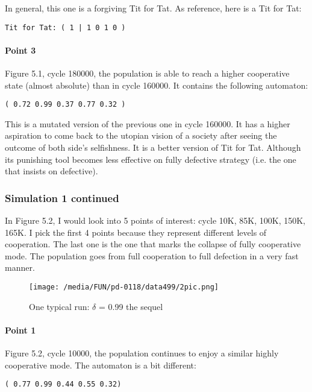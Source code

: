 \documentclass[12.5pt]{report}
\begin{document}
In general, this one is a forgiving Tit for Tat. As reference, here is a Tit for Tat:

\begin{verbatim}
Tit for Tat: ( 1 | 1 0 1 0 )
\end{verbatim}

\paragraph{Point 3}

Figure 5.1, cycle 180000, the population is able to reach a higher cooperative state (almost absolute) than in cycle 160000. It contains the following automaton:
\begin{verbatim}
( 0.72 0.99 0.37 0.77 0.32 )
\end{verbatim}

This is a mutated version of the previous one in cycle 160000. It has a higher aspiration to come back to the utopian vision of a society after seeing the outcome of both side's selfishness. It is a better version of Tit for Tat. Although its punishing tool becomes less effective on fully defective strategy (i.e. the one that insists on defective).

\subsubsection{Simulation 1 continued}

In Figure 5.2, I would look into 5 points of interest: cycle 10K, 85K, 100K, 150K, 165K. I pick the first 4 points because they represent different levels of cooperation. The last one is the one that marks the collapse of fully cooperative mode. The population goes from full cooperation to full defection in a very fast manner.

\begin{figure}
\center
\texttt{[image: /media/FUN/pd-0118/data499/2pic.png]}
\caption{One typical run: $\delta$ = 0.99 the sequel}
\end{figure}

\paragraph{Point 1}

Figure 5.2, cycle 10000, the population continues to enjoy a similar highly cooperative mode. The automaton is a bit different:
\begin{verbatim}
( 0.77 0.99 0.44 0.55 0.32)
\end{verbatim}
\end{document}
